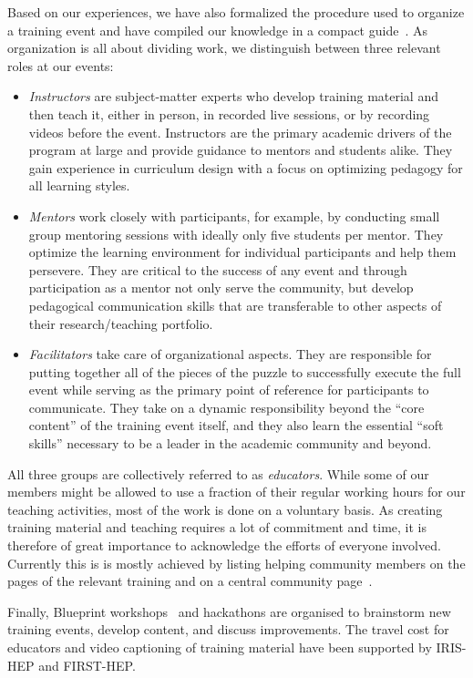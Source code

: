 \documentclass[twocolumn]{svjour3}          %
\begin{document}
Based on our experiences, we have also formalized the procedure used to organize  a training event and have compiled our knowledge in a compact guide~\cite{HSF-training-how-to}.
As organization is all about dividing work, we distinguish between three relevant roles at our events:
\begin{itemize}
    \item \emph{Instructors} are subject-matter experts who develop training material and then teach it, either in person, in recorded live sessions, or by recording videos before the event.  Instructors are the primary academic drivers of the program at large and provide guidance to mentors and students alike. They gain experience in curriculum design with a focus on optimizing pedagogy for all learning styles.
    \item \emph{Mentors} work closely with participants, for example, by conducting small group mentoring sessions with ideally only five students per mentor. They optimize the learning environment for individual participants and help them persevere.  They are critical to the success of any event and through participation as a mentor not only serve the community, but develop pedagogical communication skills that are transferable to other aspects of their research/teaching portfolio.
    \item \emph{Facilitators} take care of organizational aspects. They are responsible for putting together all of the pieces of the puzzle to successfully execute the full event while serving as the primary point of reference for participants to communicate. They take on a dynamic responsibility beyond the \enquote{core content} of the training event itself, and they also learn the essential \enquote{soft skills} necessary to be a leader in the academic community and beyond.
\end{itemize}
All three groups are collectively referred to as \emph{educators}.
While some of our members might be allowed to use a fraction of their regular working hours for our teaching activities, most of the work is done on a voluntary basis.
As creating training material and teaching requires a lot of commitment and time, it is therefore of great importance to acknowledge the efforts of everyone involved. Currently this is is mostly achieved by listing helping community members on the pages of the relevant training and on a central community page~\cite{HSF-training-community}.

Finally, Blueprint workshops~\cite{HSF-training-blueprint} and hackathons \cite{HSF-training-hackathon} are organised to brainstorm new training events, develop content, and discuss improvements. The travel cost for educators and video captioning of training material have been supported by IRIS-HEP and FIRST-HEP.
\end{document}

